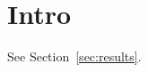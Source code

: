 \documentclass{article}
\begin{document}
\section{Intro}\label{sec:intro}
See Section~\ref{sec:results}.
\end{document}

